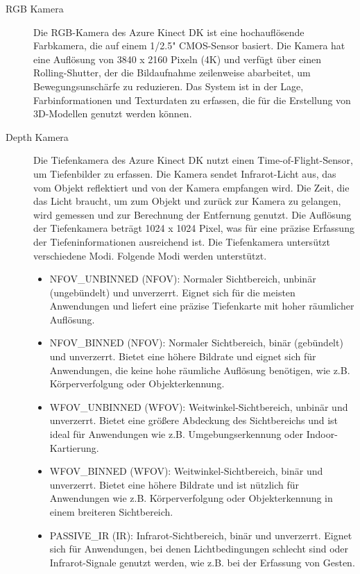     \begin{description}

        \label{azure-kamera}
        \item[RGB Kamera] Die RGB-Kamera des Azure Kinect DK ist eine hochauflösende Farbkamera, die auf einem 1/2.5" CMOS-Sensor basiert. Die Kamera hat eine Auflösung von 3840 x 2160 Pixeln (4K) und verfügt über einen Rolling-Shutter, der die Bildaufnahme zeilenweise abarbeitet, um Bewegungsunschärfe zu reduzieren. Das System ist in der Lage, Farbinformationen und Texturdaten zu erfassen, die für die Erstellung von 3D-Modellen genutzt werden können.
        \item[Depth Kamera] Die Tiefenkamera des Azure Kinect \ac{DK} nutzt einen Time-of-Flight-Sensor, um Tiefenbilder zu erfassen. Die Kamera sendet Infrarot-Licht aus, das vom Objekt reflektiert und von der Kamera empfangen wird. Die Zeit, die das Licht braucht, um zum Objekt und zurück zur Kamera zu gelangen, wird gemessen und zur Berechnung der Entfernung genutzt. Die Auflösung der Tiefenkamera beträgt 1024 x 1024 Pixel, was für eine präzise Erfassung der Tiefeninformationen ausreichend ist. Die Tiefenkamera untersützt verschiedene Modi. Folgende Modi werden unterstützt.
    
    \begin{itemize}
            \item NFOV\_UNBINNED (NFOV): Normaler Sichtbereich, unbinär (ungebündelt) und unverzerrt. Eignet sich für die meisten Anwendungen und liefert eine präzise Tiefenkarte mit hoher räumlicher Auflösung.
            \item NFOV\_BINNED (NFOV): Normaler Sichtbereich, binär (gebündelt) und unverzerrt. Bietet eine höhere Bildrate und eignet sich für Anwendungen, die keine hohe räumliche Auflösung benötigen, wie z.B. Körperverfolgung oder Objekterkennung.
            \item WFOV\_UNBINNED (WFOV): Weitwinkel-Sichtbereich, unbinär und unverzerrt. Bietet eine größere Abdeckung des Sichtbereichs und ist ideal für Anwendungen wie z.B. Umgebungserkennung oder Indoor-Kartierung.
            \item WFOV\_BINNED (WFOV): Weitwinkel-Sichtbereich, binär und unverzerrt. Bietet eine höhere Bildrate und ist nützlich für Anwendungen wie z.B. Körperverfolgung oder Objekterkennung in einem breiteren Sichtbereich.
            \item PASSIVE\_IR (IR): Infrarot-Sichtbereich, binär und unverzerrt. Eignet sich für Anwendungen, bei denen Lichtbedingungen schlecht sind oder Infrarot-Signale genutzt werden, wie z.B. bei der Erfassung von Gesten.
        \end{itemize}
    \end{description}

